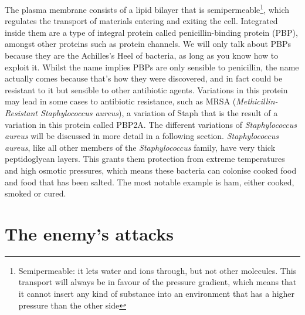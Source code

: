 The plasma membrane consists of a lipid bilayer that is semipermeable\footnote{Semipermeable: it lets water and ions through, but not other molecules. This transport will always be in favour of the pressure gradient, which means that it cannot insert any kind of substance into an environment that has a higher pressure than the other side}, which regulates the transport of materials entering and exiting the cell. Integrated inside them are a type of integral protein called penicillin-binding protein (PBP), amongst other  proteins such as protein channels. We will only talk about PBPs because they are the Achilles's Heel of bacteria, as long as you know how to exploit it. Whilst the name implies PBPs are only sensible to penicillin, the name actually comes because that's how they were discovered, and in fact could be resistant to it but sensible to other antibiotic agents. Variations in this protein may lead in some cases to antibiotic resistance, such as MRSA (\emph{Methicillin-Resistant \emph{Staphylococcus aureus}}), a variation of Staph that is the result of a variation in this protein called PBP2A. The different variations of \emph{Staphylococcus aureus} will be discussed in more detail in a following section. \newline
\emph{Staphylococcus aureus}, like all other members of the \emph{Staphylococcus} family, have very thick peptidoglycan layers. This grants them protection from extreme temperatures and high osmotic pressures, which means these bacteria can colonise cooked food and food that has been salted. The most notable example is ham, either cooked, smoked or cured.
\section{The enemy's attacks}
